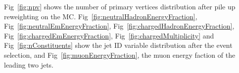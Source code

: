 

Fig~\ref{fig:npv} shows the number of primary vertices distribution after pile up reweighting on the MC. 
Fig~\ref{fig:neutralHadronEnergyFraction}, Fig~\ref{fig:neutralEmEnergyFraction}, Fig~\ref{fig:chargedHadronEnergyFraction}, Fig~\ref{fig:chargedEmEnergyFraction}, Fig~\ref{fig:chargedMultiplicity} and Fig~\ref{fig:nConstituents} show the jet ID variable distribution after the event selection, and Fig~\ref{fig:muonEnergyFraction}, the muon energy faction of the leading two jets.

\clearpage
